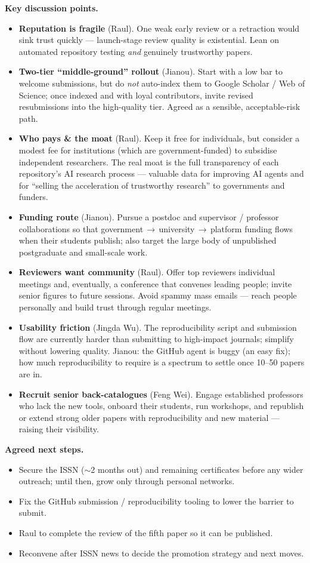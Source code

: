 \documentclass[11pt]{article}
\begin{document}
{\textbf{Key discussion points.}
\begin{itemize}[leftmargin=1.1em, itemsep=1.5pt, topsep=2pt]
\item \textbf{Reputation is fragile} (Raul). One weak early review or a retraction would sink trust quickly --- launch-stage review quality is existential. Lean on automated repository testing \emph{and} genuinely trustworthy papers.
\item \textbf{Two-tier ``middle-ground'' rollout} (Jianou). Start with a low bar to welcome submissions, but do \emph{not} auto-index them to Google Scholar / Web of Science; once indexed and with loyal contributors, invite revised resubmissions into the high-quality tier. Agreed as a sensible, acceptable-risk path.
\item \textbf{Who pays \& the moat} (Raul). Keep it free for individuals, but consider a modest fee for institutions (which are government-funded) to subsidise independent researchers. The real moat is the full transparency of each repository's AI research process --- valuable data for improving AI agents and for ``selling the acceleration of trustworthy research'' to governments and funders.
\item \textbf{Funding route} (Jianou). Pursue a postdoc and supervisor / professor collaborations so that government\,$\rightarrow$\,university\,$\rightarrow$\,platform funding flows when their students publish; also target the large body of unpublished postgraduate and small-scale work.
\item \textbf{Reviewers want community} (Raul). Offer top reviewers individual meetings and, eventually, a conference that convenes leading people; invite senior figures to future sessions. Avoid spammy mass emails --- reach people personally and build trust through regular meetings.
\item \textbf{Usability friction} (Jingda Wu). The reproducibility script and submission flow are currently harder than submitting to high-impact journals; simplify without lowering quality. Jianou: the GitHub agent is buggy (an easy fix); how much reproducibility to require is a spectrum to settle once 10--50 papers are in.
\item \textbf{Recruit senior back-catalogues} (Feng Wei). Engage established professors who lack the new tools, onboard their students, run workshops, and republish or extend strong older papers with reproducibility and new material --- raising their visibility.
\end{itemize}

\textbf{Agreed next steps.}
\begin{itemize}[leftmargin=1.1em, itemsep=1.5pt, topsep=2pt]
\item Secure the ISSN ($\sim$2 months out) and remaining certificates before any wider outreach; until then, grow only through personal networks.
\item Fix the GitHub submission / reproducibility tooling to lower the barrier to submit.
\item Raul to complete the review of the fifth paper so it can be published.
\item Reconvene after ISSN news to decide the promotion strategy and next moves.
\end{itemize}
}
\end{document}
